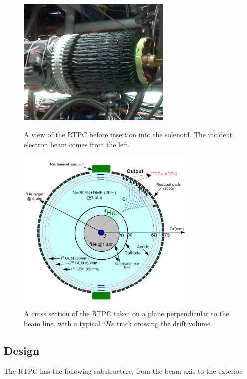 \begin{figure}[tp]
\begin{minipage}[c]{.46\linewidth}
\vspace{0.3in}
\includegraphics[height=6.2cm]{fig_rtpc/RTPC_exp_cut.jpg}
\vspace{0.1in}
\caption{A view of the RTPC before insertion into the solenoid. The incident electron beam comes from the left.} 
\label{fig:RTPC2}
\end{minipage} \hfill
\begin{minipage}[c]{.46\linewidth}
\hspace*{-0.3in}\includegraphics[height=8.0cm]{fig_rtpc/RTPC_1_all.png}
\caption{A cross section of the RTPC taken on a plane perpendicular to the beam line, with a typical $^4He$ track crossing the drift volume.}
\label{fig:RTPC_xscetion}
\end{minipage}
\end{figure}


\subsection{Design}

The RTPC has the following substructure, from the beam axis to the exterior:

